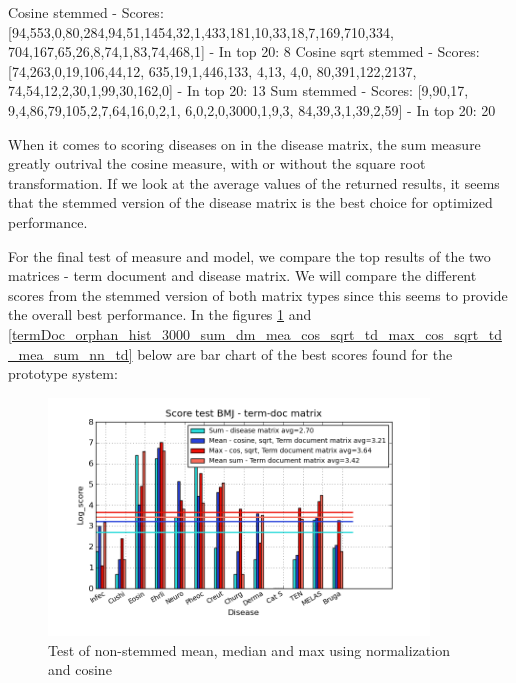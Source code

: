  
Cosine stemmed - Scores: [94,553,0,80,284,94,51,1454,32,1,433,181,10,33,18,7,169,710,334, 704,167,65,26,8,74,1,83,74,468,1] - In top 20: 8
Cosine sqrt stemmed - Scores: [74,263,0,19,106,44,12, 635,19,1,446,133, 4,13, 4,0, 80,391,122,2137, 74,54,12,2,30,1,99,30,162,0] - In top 20: 13
Sum stemmed - Scores: [9,90,17, 9,4,86,79,105,2,7,64,16,0,2,1, 6,0,2,0,3000,1,9,3, 84,39,3,1,39,2,59] - In top 20: 20

When it comes to scoring diseases on in the disease matrix, the sum measure greatly outrival the cosine measure, with or without the square root transformation. If we look at the average values of the returned results, it seems that the stemmed version of the disease matrix is the best choice for optimized performance. 

For the final test of measure and model, we compare the top results of the two matrices - term document and disease matrix. We will compare the different scores from the stemmed version of both matrix types since this seems to provide the overall best performance. In the figures \ref{termDoc_bmj_hist_3000_sum_dm_mea_cos_sqrt_td_max_cos_sqrt_td_mea_sum_td} and \ref{termDoc_orphan_hist_3000_sum_dm_mea_cos_sqrt_td_max_cos_sqrt_td_mea_sum_nn_td} below are bar chart of the best scores found for the prototype system:

\begin{figure}[h!]
        \begin{center}
          \includegraphics[width=0.9\textwidth]{barcharts/termDoc_bmj_hist_3000_sum_dm_mea_cos_sqrt_td_max_cos_sqrt_td_mea_sum_td.png}
        \end{center}
        \caption{Test of non-stemmed mean, median and max using normalization and cosine}
        \label{termDoc_bmj_hist_3000_sum_dm_mea_cos_sqrt_td_max_cos_sqrt_td_mea_sum_td}
\end{figure}
 
